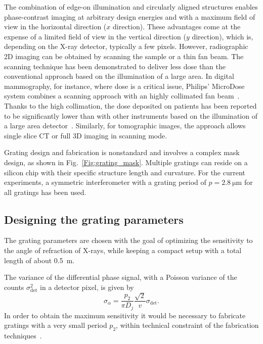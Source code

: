The combination of edge-on illumination and circularly aligned structures
enables phase-contrast imaging at arbitrary design energies and with a
maximum field of view in the horizontal direction ($x$ direction). These
advantages come at the expense of a limited field of view in the vertical
direction ($y$ direction), which is, depending on the X-ray detector,
typically a few pixels. However, radiographic 2D imaging can be obtained by
scanning the sample or a thin fan beam. The scanning technique has been
demonstrated to deliver less dose than the conventional approach based on
the illumination of a large area. In digital mammography, for instance,
where dose is a critical issue, Philips' MicroDose system combines a
scanning approach with an highly collimated fan beam~\cite{Aslund2007}.
Thanks to the high collimation, the dose deposited on  patients has been
reported to be significantly lower than with other instruments based on the
illumination of a large area detector~\cite{Oduko2010}. Similarly, for
tomographic images, the approach allows single slice \ac{CT} or full 3D
imaging in scanning mode.

Grating design and fabrication is nonstandard and involves a complex mask
design, as shown in Fig.~\ref{Fig:grating_mask}. Multiple gratings can
reside on a silicon chip with their specific structure length and curvature.
For the current experiments, a symmetric interferometer with a grating
period of $p = \SI{2.8}{\micro\metre}$ for all gratings has been used.

\subsection{Designing the grating parameters}
The grating parameters are chosen with the goal of optimizing the
sensitivity to the angle of refraction of X-rays, while keeping a compact
setup with a total length of about \SI{0.5}{\meter}.

The variance of the differential phase signal, with a Poisson variance of
the counts $\sigma_{\text{det}}^2$ in a detector pixel, is given by~\cite{Raupach2011}
\begin{equation}
    \sigma_\alpha = \frac{p_2}{\pi D_j}
    \frac{\sqrt{2}}{v}\sigma_{\text{det}}.\label{eq:variance}
\end{equation}
In order to obtain the maximum sensitivity it would be necessary to
fabricate gratings with a very small period
$p_2$, within technical constraint of the fabrication
techniques~\cite{David2007,Kenntner2010}.

